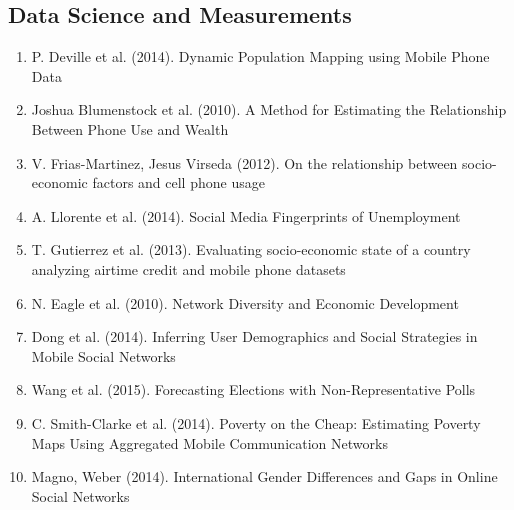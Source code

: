 \subsection{Data Science and Measurements}  
\begin{enumerate}  
\item  P. Deville et al. (2014).  Dynamic Population Mapping using Mobile Phone Data\cite{Deville_2014} 
\item  Joshua Blumenstock et al. (2010).  A Method for Estimating the Relationship Between Phone Use and Wealth\cite{blumenstock2010method}  
\item  V. Frias-Martinez, Jesus Virseda (2012).  On the relationship between socio-economic factors and cell phone usage \cite{Frias_Martinez_2012} 
\item A. Llorente et al. (2014).  Social Media Fingerprints of Unemployment\cite{Llorente_2015}  
\item T. Gutierrez et al. (2013).  Evaluating socio-economic state of a country analyzing airtime credit and mobile phone datasets\cite{gutierrez2013evaluating}  
\item N. Eagle et al. (2010).  Network Diversity and Economic Development\cite{eagle2010network}   
\item Dong et al. (2014).  Inferring User Demographics and Social Strategies in Mobile Social Networks \cite{Dong:2014:IUD:2623330.2623703} 
\item Wang et al. (2015).  Forecasting Elections with Non-Representative Polls\cite{Wang2015980} 
\item C. Smith-Clarke et al. (2014).  Poverty on the Cheap: Estimating Poverty Maps Using Aggregated Mobile Communication Networks\cite{Smith-Clarke:2014:PCE:2556288.2557358} 
\item Magno, Weber (2014). International Gender Differences and Gaps in Online Social Networks \cite{Magno_2014}
\end{enumerate}  
\\
